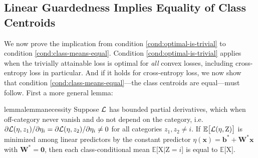 \documentclass{article}
\theoremstyle{plain}
\theoremstyle{remark}
\newcommand{\E}{\mathbb E}
\theoremstyle{plain}
\theoremstyle{TheoremNum}
\newcommand{\rv}[1]{{\mathrm{#1}}}
\newcommand{\loss}{\color{black} \mathcal{L}}
\begin{document}
\subsection{Linear Guardedness Implies Equality of Class Centroids}\label{sec:necessity}

We now prove the implication from condition \ref{cond:optimal-is-trivial} to condition \ref{cond:class-means-equal}. Condition \ref{cond:optimal-is-trivial} applies when the trivially attainable loss is optimal for \textit{all} convex losses, including cross-entropy loss in particular. And if it holds for cross-entropy loss, we now show that condition \ref{cond:class-means-equal}---the class centroids are equal---must follow. First a more general lemma:

\begin{restatable}{lemma}{lemmanecessity}\label{necessity-lemma}
    Suppose $\loss$ has bounded partial derivatives, which when off-category never vanish and do not depend on the category, i.e.
        ${\partial \loss(\eta, z_1)}/{\partial \eta_i} = {\partial \loss(\eta, z_2)}/{\partial \eta_i} \neq 0$
    for all categories $z_1, z_2 \neq i$. If $\E \big[\loss(\eta, \rv Z)\big]$ is minimized among linear predictors by the constant predictor $\eta(\mathbf{x}) = \mathbf{b^*} + \mathbf{W^*x}$ with $\mathbf W^* = \mathbf{0}$, then each class-conditional mean $\E\big[\rv X|\rv Z = i\big]$ is equal to $\E\big[\rv X\big]$.
\end{restatable}
\end{document}
